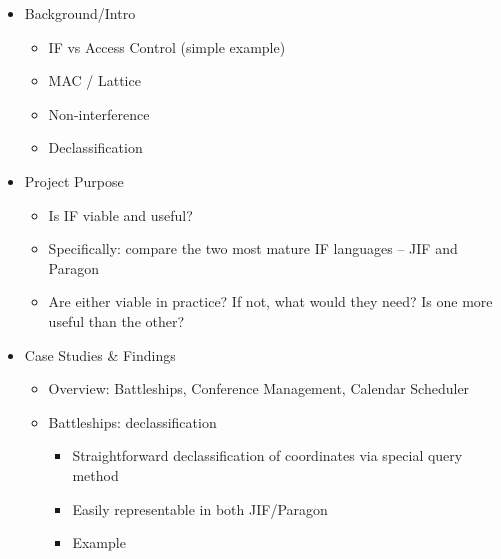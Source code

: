 \begin{itemize}
	
	\item Background/Intro
	
	\begin{itemize}
		
		\item IF vs Access Control (simple example)
		
		\item MAC / Lattice
		
		\item Non-interference
		
		\item Declassification
		
	\end{itemize}

	\item Project Purpose
	
	\begin{itemize}
		
		\item Is IF viable and useful?
		
		\item Specifically: compare the two most mature IF languages -- JIF and Paragon
		
		\item Are either viable in practice? If not, what would they need? Is one more useful than the other?
		
	\end{itemize}
	
	\item Case Studies \& Findings
	
	\begin{itemize}
		
		\item Overview: Battleships, Conference Management, Calendar Scheduler
		
		\item Battleships: declassification
		
		\begin{itemize}
			
			\item Straightforward declassification of coordinates via special query method
			
			\item Easily representable in both JIF/Paragon
			
			\item Example
			

\end{itemize}
\end{itemize}
\end{itemize}
